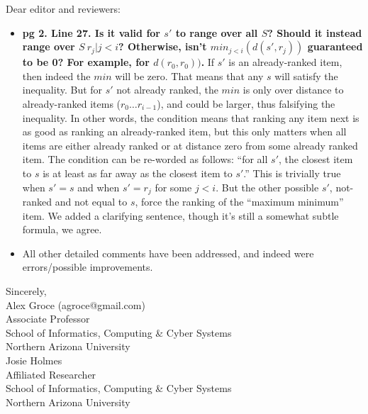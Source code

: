 \documentclass{letter}
\begin{document}
\begin{letter}{}

  \address{Alex Groce\\School of Informatics, Computing \& Cyber Systems\\Northern Arizona University}

  \opening{Dear editor and reviewers:}



\begin{itemize}
\item {\bf pg 2. Line 27. Is it valid for $s'$ to range over all $S$? Should it instead range over $S \ { r_j | j < i }$? Otherwise, isn't $min_{j<i}(d(s', r_j))$ guaranteed to be 0? For example, for $d(r_0, r_0))$.}  If $s'$ is an already-ranked item, then indeed the $min$ will be zero.  That means that any $s$ will satisfy the inequality.  But for $s'$ not already ranked, the $min$ is only over distance to already-ranked items ($r_0 \ldots r_{i-1}$), and could be larger, thus falsifying the inequality.  In other words, the condition means that ranking any item next is as good as ranking an already-ranked item, but this only matters when all items are either already ranked or at distance zero from some already ranked item.  The condition can be re-worded as follows:  ``for all $s'$, the closest item to $s$ is at least as far away as the closest item to $s'$.''  This is trivially true when $s' = s$ and when $s' = r_j$ for some $j<i$.  But the other possible $s'$, not-ranked and not equal to $s$, force the ranking of the ``maximum minimum'' item.  We added a clarifying sentence, though it's still a somewhat subtle formula, we agree.
  \item All other detailed comments have been addressed, and indeed were errors/possible improvements.
\end{itemize}

  \closing{Sincerely,\\Alex Groce (agroce@gmail.com)\\Associate
    Professor\\
    School of Informatics, Computing \& Cyber Systems\\Northern
    Arizona University \vspace{0.1in}\\Josie Holmes\\Affiliated Researcher\\
    School of Informatics, Computing \& Cyber Systems\\Northern Arizona University}

\end{letter}
\end{document}

